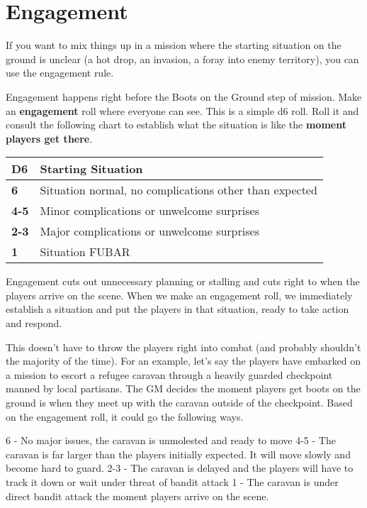 \section{Engagement}

If you want to mix things up in a mission where the starting situation on the ground is unclear (a
hot drop, an invasion, a foray into enemy territory), you can use the engagement rule.

Engagement happens right before the Boots on the Ground step of mission. Make an
\textbf{engagement} roll where everyone can see. This is a simple d6 roll. Roll it and consult the
following chart to establish what the situation is like the \textbf{moment players get there}.

\begin{center}
    \begin{tabular}{| l | l |}
    \hline
    \textbf{D6} &  \textbf{Starting Situation} \\ \hline
    \textbf{6} & Situation normal, no complications other than expected \\ \hline
    \textbf{4-5} & Minor complications or unwelcome surprises \\ \hline
    \textbf{2-3}  & Major complications or unwelcome surprises \\ \hline
    \textbf{1} & Situation FUBAR \\ \hline
    \end{tabular}
\end{center}                    

Engagement cuts out unnecessary planning or stalling and cuts right to when the players arrive
on the scene. When we make an engagement roll, we immediately establish a situation and put
the players in that situation, ready to take action and respond.

This doesn’t have to throw the players right into combat (and probably shouldn’t the majority of
the time). For an example, let’s say the players have embarked on a mission to escort a refugee
caravan through a heavily guarded checkpoint manned by local partisans. The GM decides the
moment players get boots on the ground is when they meet up with the caravan outside of the
checkpoint. Based on the engagement roll, it could go the following ways.

6 - No major issues, the caravan is unmolested and ready to move
4-5 - The caravan is far larger than the players initially expected. It will move slowly and become
hard to guard.
2-3 - The caravan is delayed and the players will have to track it down or wait under threat of
bandit attack
1 - The caravan is under direct bandit attack the moment players arrive on the scene.

